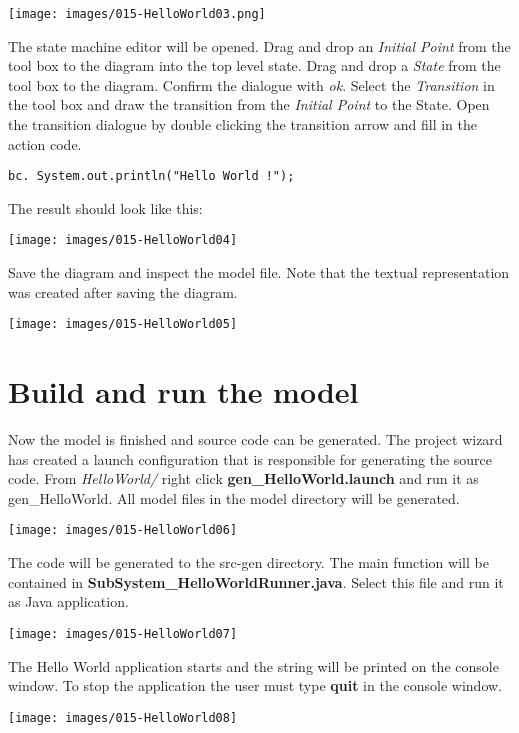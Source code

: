 \texttt{[image: images/015-HelloWorld03.png]}

The state machine editor will be opened. Drag and drop an \textit{Initial Point} from the tool box to the diagram into the top level state. Drag and drop a \textit{State} from the tool box to the diagram. Confirm the dialogue with \textit{ok}. Select the \textit{Transition} in the tool box and draw the transition from the \textit{Initial Point} to the State. Open the transition dialogue by double clicking the transition arrow and fill in the action code.

\begin{verbatim}
bc. System.out.println("Hello World !");
\end{verbatim}
 
The result should look like this:

\texttt{[image: images/015-HelloWorld04]}

Save the diagram and inspect the model file. Note that the textual representation was created after saving the diagram.

\texttt{[image: images/015-HelloWorld05]}


\section{Build and run the model}

Now the model is finished and source code can be generated. The project wizard has created a launch configuration that is responsible for generating the source code. From \textit{HelloWorld/} right click \textbf{gen\_HelloWorld.launch} and run it as gen\_HelloWorld. All model files in the model directory will be generated.

\texttt{[image: images/015-HelloWorld06]}

The code will be generated to the src-gen directory. The main function will be contained in \textbf{SubSystem\_HelloWorldRunner.java}. Select this file and run it as Java application.

\texttt{[image: images/015-HelloWorld07]}


The Hello World application starts and the string will be printed on the console window. To stop the application the user must type \textbf{quit} in the console window.

\texttt{[image: images/015-HelloWorld08]}

